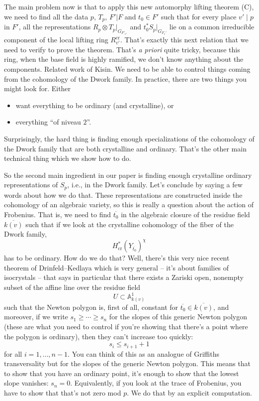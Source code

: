 \documentclass[reqno]{amsart} 
\begin{document}
The main problem now is that to apply this new automorphy lifting theorem (C), we need to find all the data $p$, $T_p$, $F' | F$ and $t_0 \in F'$ such that for every place $v' \mid p$ in $F'$, all the representations $R_p \otimes T_p |_{G_{F'_{v '}}}$ and $t_0^\ast S_p  |_{G_{F_v '}}$ lie on a common irreducible component of the local lifting ring $R^{\mathrm{cr}}_{v '}$.  That's exactly this next relation that we need to verify to prove the theorem.  That's \emph{a priori} quite tricky, because this ring, when the base field is highly ramified, we don't know anything about the components.  Related work of Kisin.  We need to be able to control things coming from the cohomology of the Dwork family.  In practice, there are two things you might look for.  Either
\begin{itemize}
\item want everything to be ordinary (and crystalline), or
\item everything ``of niveau $2$''.
\end{itemize}
Surprisingly, the hard thing is finding enough specializations of the cohomology of the Dwork family that are both crystalline and ordinary.  That's the other main technical thing which we show how to do.

So the second main ingredient in our paper is finding enough crystalline ordinary representations of $S_p$, i.e., in the Dwork family.  Let's conclude by saying a few words about how we do that.  These representations are constructed inside the cohomology of an algebraic variety, so this is really a question about the action of Frobenius.  That is, we need to find $\overline{t_0}$ in the algebraic closure of the residue field $\overline{k(v)}$ such that if we look at the crystalline cohomology of the fiber of the Dwork family,
\begin{equation*}
  H^\ast_{\mathrm{cr}} \left( Y_{\overline{t_0}} \right)^{\chi}
\end{equation*}
has to be ordinary.  How do we do that?  Well, there's this very nice recent theorem of Drinfeld--Kedlaya which is very general -- it's about families of isocrystals -- that says in particular that there exists a Zariski open, nonempty subset of the affine line over the residue field
\begin{equation*}
  U \subset \mathbb{A}^1_{k(v)}
\end{equation*}
such that the Newton polygon is, first of all, constant for $\overline{t_0} \in \overline{k(v)}$, and moreover, if we write $s_1 \geq \dotsb \geq s_n$ for the slopes of this generic Newton polygon (these are what you need to control if you're showing that there's a point where the polygon is ordinary), then they can't increase too quickly:
\begin{equation*}
  s_i \leq s_{i + 1} + 1
\end{equation*}
for all $i = 1, \dotsc, n - 1$.  You can think of this as an analogue of Griffiths transversality but for the slopes of the generic Newton polygon.  This means that to show that you have an ordinary point, it's enough to show that the lowest slope vanishes: $s_n = 0$.  Equivalently, if you look at the trace of Frobenius, you have to show that that's not zero mod $p$.  We do that by an explicit computation.


{} 
\end{document}
